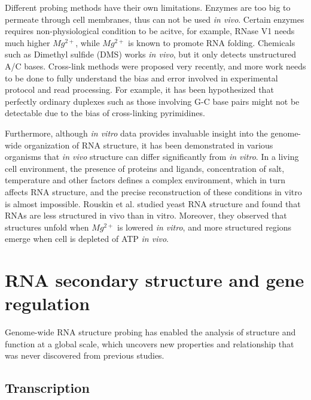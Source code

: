 \documentclass{proposal}
\begin{document}
Different probing methods have their own limitations.
Enzymes are too big to ﻿permeate through cell membranes, thus can not be used \textit{in vivo}.
Certain enzymes requires non-physiological condition to be acitve,
for example, ﻿RNase V1 needs much higher $Mg^{2+}$, while $Mg^{2+}$ is known to promote RNA folding.
Chemicals such as ﻿Dimethyl sulfide (DMS) works \textit{in vivo},
but it only detects unstructured A/C bases.
Cross-link methods were proposed very recently, and more work needs to be done to fully understand
 the bias and error involved in experimental protocol and read processing.
For example, it has been hypothesized that perfectly ordinary duplexes such as those
involving G-C base pairs might not be detectable due to the bias of cross-linking pyrimidines\cite{stefanov2018deciphering}.

Furthermore, although \textit{in vitro} data provides invaluable insight into the genome-wide organization of RNA structure,
it has been demonstrated in various organisms that \textit{in vivo} structure can differ significantly from \textit{in vitro}.
In a living cell environment, the presence of proteins and ligands,
concentration of salt, temperature and other factors defines a complex environment, which in turn affects RNA structure,
and the precise reconstruction of these conditions in vitro is almost impossible.
﻿Rouskin et al.\cite{rouskin2014genome} studied yeast RNA structure and found that RNAs are less structured in vivo than in vitro.
Moreover, they observed that structures unfold when $Mg^{2+}$ is lowered \textit{in vitro},
and more structured regions emerge when cell is depleted of ATP \textit{in vivo}.




\section{RNA secondary structure and gene regulation}

Genome-wide RNA structure probing has enabled the analysis of structure and function at a global scale,
which uncovers new properties and relationship that was never discovered from previous studies.

\subsection*{Transcription}
\end{document}
